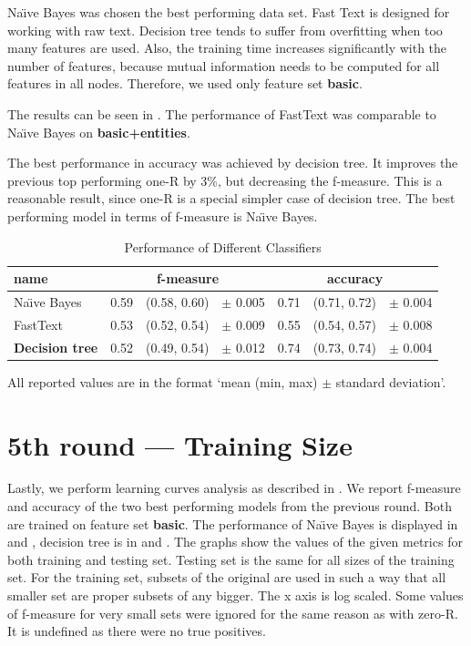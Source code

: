 Na\"{\i}ve Bayes was chosen the best performing data set.
Fast Text is designed for working with raw text.
Decision tree tends to suffer from overfitting when too many features are used.
Also, the training time increases significantly with the number of features,
because mutual information needs to be computed for all features in all nodes.
Therefore, we used only feature set \textbf{basic}.

The results can be seen in .
The performance of FastText was comparable to Na\"{\i}ve Bayes on \textbf{basic+entities}.


The best performance in accuracy was achieved by decision tree.
It improves the previous top performing one-R by 3\%, but decreasing the f-measure.
This is a reasonable result, since one-R is a special simpler case of decision tree.
The best performing model in terms of f-measure is Na\"{\i}ve Bayes.


\begin{table}[h!]

\centering
\begin{tabular}{lr@{~}r@{~}rr@{~}r@{~}r}
\toprule
\textbf{name}	& \multicolumn{3}{c}{\textbf{f-measure}} & \multicolumn{3}{c}{\textbf{accuracy}} \\
\midrule

Na\"{\i}ve Bayes & 0.59 & (0.58, 0.60) & $\pm$ 0.005 & 0.71 & (0.71, 0.72) & $\pm$ 0.004		\\

FastText & 0.53 & (0.52, 0.54) & $\pm$ 0.009 & 0.55 & (0.54, 0.57) & $\pm$ 0.008 \\
\textbf{Decision tree} & 0.52 & (0.49, 0.54) & $\pm$ 0.012 & 0.74 & (0.73, 0.74) & $\pm$ 0.004 \\

\bottomrule
\end{tabular}

\caption{Performance of Different Classifiers}\label{tab:clsf_perf}
All reported values are in the format `mean (min, max) $\pm$ standard deviation'.
\end{table}


\section{5th round --- Training Size}

Lastly, we perform learning curves analysis as described in .
We report f-measure and accuracy of the two best performing models from the previous round.
Both are trained on feature set \textbf{basic}.
The performance of Na\"{\i}ve Bayes is displayed in  and ,
decision tree is in  and .
The graphs show the values of the given metrics for both training and testing set.
Testing set is the same for all sizes of the training set.
For the training set, subsets of the original are used in such a way that 
all smaller set are proper subsets of any bigger.
The x axis is log scaled.
Some values of f-measure for very small sets were ignored for the same reason as with zero-R.
It is undefined as there were no true positives.

